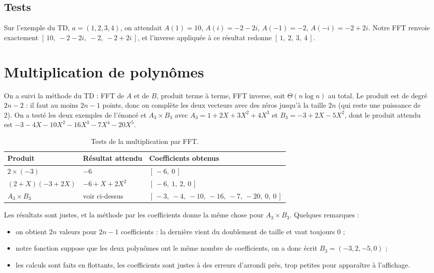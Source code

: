 \documentclass[11pt,a4paper]{article}
\begin{document}
\subsection{Tests}

Sur l'exemple du TD, $a = (1, 2, 3, 4)$, on attendait
$A(1) = 10$, $A(i) = -2 - 2i$, $A(-1) = -2$, $A(-i) = -2 + 2i$. Notre FFT renvoie
exactement $[\,10,\ -2-2i,\ -2,\ -2+2i\,]$, et l'inverse appliquée à ce résultat
redonne $[\,1,\ 2,\ 3,\ 4\,]$.

\section{Multiplication de polynômes}

On a suivi la méthode du TD : FFT de $A$ et de $B$, produit terme à terme, FFT
inverse, soit $\Theta(n \log n)$ au total. Le produit est de degré $2n-2$ : il faut
au moins $2n-1$ points, donc on complète les deux vecteurs avec des zéros jusqu'à la
taille $2n$ (qui reste une puissance de 2). On a testé les deux exemples de l'énoncé
et $A_3 \times B_3$ avec $A_3 = 1 + 2X + 3X^2 + 4X^3$ et $B_3 = -3 + 2X - 5X^2$, dont
le produit attendu est $-3 - 4X - 10X^2 - 16X^3 - 7X^4 - 20X^5$.

\begin{table}[H]
\centering
\caption{Tests de la multiplication par FFT.}
\label{tab:mult}
\begin{tabular}{|l|l|l|}
\hline
\textbf{Produit} & \textbf{Résultat attendu} & \textbf{Coefficients obtenus} \\
\hline
$2 \times (-3)$ & $-6$ & $[\,-6,\ 0\,]$ \\
\hline
$(2 + X)(-3 + 2X)$ & $-6 + X + 2X^2$ & $[\,-6,\ 1,\ 2,\ 0\,]$ \\
\hline
$A_3 \times B_3$ & voir ci-dessus &
  $[\,-3,\ -4,\ -10,\ -16,\ -7,\ -20,\ 0,\ 0\,]$ \\
\hline
\end{tabular}
\end{table}

Les résultats sont justes, et la méthode par les coefficients donne la même chose
pour $A_3 \times B_3$. Quelques remarques :
\begin{itemize}
  \item on obtient $2n$ valeurs pour $2n-1$ coefficients : la dernière vient du
        doublement de taille et vaut toujours 0 ;
  \item notre fonction suppose que les deux polynômes ont le même nombre de
        coefficients, on a donc écrit $B_3 = (-3, 2, -5, 0)$ ;
  \item les calculs sont faits en flottants, les coefficients sont justes à des
        erreurs d'arrondi près, trop petites pour apparaître à l'affichage.
\end{itemize}
\end{document}
